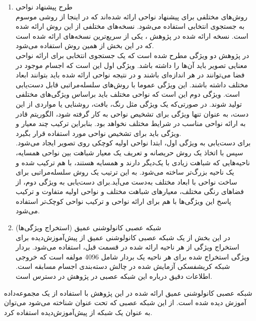 \begin{enumerate}
\item طرح پیشنهاد نواحی\\
روش‌های مختلفی برای پیشنهاد نواحی ارائه شده‌اند که در اینجا از روشی موسوم به جستجوی انتخابی استفاده می‌شود. نسخه‌های مختلفی از این روش ارائه شده است. نسخه ارائه شده در پژوهش
\cite{uijlings2013selective}،
یکی از سریع‌ترین نسخه‌های ارائه شده است که در این بخش از همین روش استفاده می‌شود.
\\
در پژوهش 
\cite{uijlings2013selective}
دو ویژگی‌ مطرح شده است که یک جستجوی انتخابی برای ارائه نواحی معنایی تصویر باید آن‌ها را داشته باشد. ویژگی اول این است که اجسام موجود در فضا می‌توانند در هر اندازه‌ای باشند و در نتیجه نواحی ارائه شده باید بتوانند ابعاد مختلف داشته باشند. این ویژگی عموما با روش‌های سلسله‌مراتبی قابل دست‌یابی است. ویژگی دوم این است که نواحی مختلف باید براساس  ویژگی‌های مختلفی تولید شوند. در صورتی‌که یک ویژگی مثل رنگ، بافت، روشنایی یا مواردی از این دست، به عنوان تنها ویژگی برای تشخیص نواحی به کار گرفته شود، الگوریتم قادر به ارائه نواحی مناسب در شرایط مختلف نخواهد بود. بنابراین ترکیب چند معیار و ویژگی باید برای تشخیص نواحی مورد استفاده قرار بگیرد. 
\\
برای دست‌یابی به ویژگی اول، ابتدا نواحی اولیه کوچکی روی تصویر ایجاد می‌شود. سپس با اتخاذ یک روش حریصانه و تعریف یک معیار شباهت بین نواحی همسایه، ناحیه‌هایی که شباهت زیادی با یک‌دیگر دارند و همسایه هستند، با هم ترکیب شده و یک ناحیه بزرگ‌تر ساخته می‌شود. به این ترتیب یک روش سلسله‌مراتبی برای ساخت نواحی با ابعاد مختلف به‌دست ‌می‌آید.برای دست‌یابی به ویژگی دوم، از فضاهای رنگی مختلف، معیارهای شباهت مختلف و نواحی اولیه متفاوت و ترکیب پاسخ این ویژگی‌ها با هم برای ارائه نواحی و ترکیب نواحی کوچک‌تر استفاده می‌شود.

\item شبکه عصبی کانولوشنی عمیق (استخراج ویژگی‌ها)\\
در این بخش از یک شبکه عصبی کانولوشنی عمیق از پیش‌آموزش‌دیده‌ برای استخراج ویژگی ‌از هر ناحیه ارائه شده در قسمت قبل، استفاده می‌شود. بردار ویژگی استخراج شده برای هر ناحیه یک بردار شامل 4096 مولفه است که خروجی شبکه کریشفسکی
آزمایش شده در چالش دسته‌بندی اجسام مسابقه   است. اطلاعات دقیق درباره این شبکه عصبی در پژوهش 
\cite{krizhevsky2012imagenet}
در دسترس است.

\end{enumerate}

شبکه عصبی کانولوشنی عمیق ارائه شده در این پژوهش با استفاده از یک مجموعه‌داده آموزش دیده شده است. از این شبکه عصبی که تحت عنوان  شناخته می‌شود می‌توان به عنوان یک شبکه از پیش‌آموزش‌دیده استفاده کرد.

